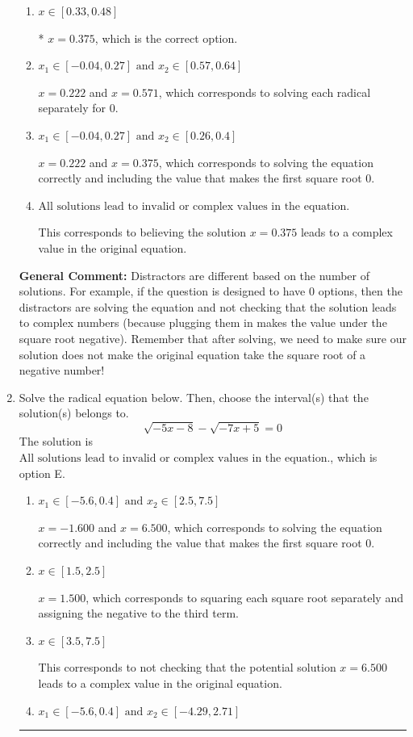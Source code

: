 \documentclass{extbook}[14pt]
\newcommand{\litem}[1]{\item #1

\rule{\textwidth}{0.4pt}}
\begin{document}
\begin{enumerate}
{\begin{enumerate}[label=\Alph*.]
$x = -0.125$, which corresponds to squaring each square root separately and assigning the negative to the third term.
\item \( x \in [0.33,0.48] \)

* $x = 0.375$, which is the correct option.
\item \( x_1 \in [-0.04, 0.27] \text{ and } x_2 \in [0.57,0.64] \)

$x = 0.222$ and $x = 0.571$, which corresponds to solving each radical separately for 0.
\item \( x_1 \in [-0.04, 0.27] \text{ and } x_2 \in [0.26,0.4] \)

$x = 0.222$ and $x = 0.375$, which corresponds to solving the equation correctly and including the value that makes the first square root 0.
\item \( \text{All solutions lead to invalid or complex values in the equation.} \)

This corresponds to believing the solution $x = 0.375$ leads to a complex value in the original equation.
\end{enumerate}

\textbf{General Comment:} Distractors are different based on the number of solutions. For example, if the question is designed to have 0 options, then the distractors are solving the equation and not checking that the solution leads to complex numbers (because plugging them in makes the value under the square root negative). Remember that after solving, we need to make sure our solution does not make the original equation take the square root of a negative number!
}
\litem{
Solve the radical equation below. Then, choose the interval(s) that the solution(s) belongs to.
\[ \sqrt{-5 x - 8} - \sqrt{-7 x + 5} = 0 \]The solution is \( \text{All solutions lead to invalid or complex values in the equation.} \), which is option E.\begin{enumerate}[label=\Alph*.]
\item \( x_1 \in [-5.6, 0.4] \text{ and } x_2 \in [2.5,7.5] \)

$x = -1.600$ and $x = 6.500$, which corresponds to solving the equation correctly and including the value that makes the first square root 0.
\item \( x \in [1.5,2.5] \)

$x = 1.500$, which corresponds to squaring each square root separately and assigning the negative to the third term.
\item \( x \in [3.5,7.5] \)

This corresponds to not checking that the potential solution $x = 6.500$ leads to a complex value in the original equation.
\item \( x_1 \in [-5.6, 0.4] \text{ and } x_2 \in [-4.29,2.71] \)


\end{enumerate}}
\end{enumerate}
\end{document}
